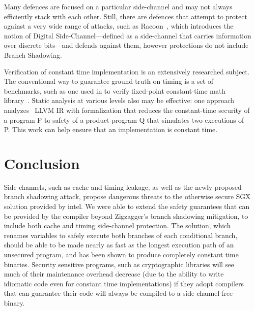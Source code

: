 \documentclass[sigplan, review]{acmart}
\begin{document}
Many defences are focused on a particular side-channel and may not always efficiently stack with each other. Still, there are defences that attempt to protect against a very wide range of attacks, such as Racoon~\cite{rane2015raccoon}, which introduces the notion of Digital Side-Channel---defined as a side-channel that carries information over discrete bits---and defends against them, however protections do not include Branch Shadowing.

Verification of constant time implementation is an extensively researched subject. The conventional way to guarantee ground truth on timing is a set of benchmarks, such as one used in to verify fixed-point constant-time math library~\cite{andrysco2015subnormal}. Static analysis at various levels also may be effective: one approach analyzes~\cite{almeida2016verifying} LLVM IR with formalization that reduces the constant-time security of a program P to safety of a product program Q that simulates two executions of P. This work can help ensure that an implementation is constant time.

\section{Conclusion}
Side channels, such as cache and timing leakage, as well as the newly proposed branch shadowing attack, propose dangerous threats to the otherwise secure SGX solution provided by intel. We were able to extend the safety guarantees that can be provided by the compiler beyond Zigzagger’s branch shadowing mitigation, to include both cache and timing side-channel protection. The solution, which renames variables to safely execute both branches of each conditional branch, should be able to be made nearly as fast as the longest execution path of an unsecured program, and has been shown to produce completely constant time binaries. Security sensitive programs, such as cryptographic libraries will see much of their maintenance overhead decrease (due to the ability to write idiomatic code even for constant time implementations) if they adopt compilers that can guarantee their code will always be compiled to a side-channel free binary.


{
}
\end{document}
